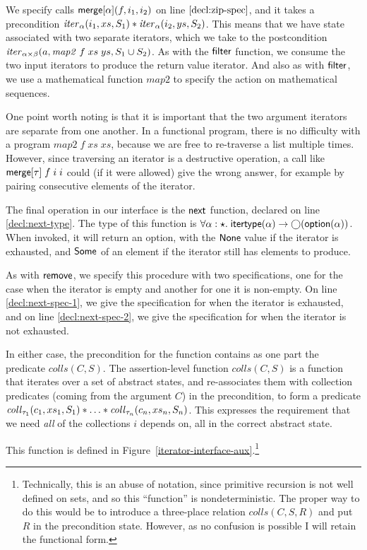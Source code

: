 We specify calls $\mathsf{merge}[\alpha](f, i_1, i_2)$ on line
$\ref{decl:zip-spec}$, and it takes a precondition
$\mathit{iter}_\alpha(i_1, xs, S_1) * \mathit{iter}_\alpha(i_2, ys, S_2)$.
This means that we have state associated with two separate iterators,
which we take to the postcondition $\mathit{iter}_{\alpha\times\beta}(a,
\mathit{map2}\;f\;xs\;ys, S_1 \cup S_2)$. As with the $\mathsf{filter}$ function, 
we consume the two input iterators to produce the return value iterator. 
And also as with $\mathsf{filter}$, we use a mathematical function $\mathit{map2}$
to specify the action on mathematical sequences. 

One point worth noting is that it is important that the two argument
iterators are separate from one another. In a functional program,
there is no difficulty with a program $\mathit{map2}\;f\;xs\;xs$, because
we are free to re-traverse a list multiple times. However, since
traversing an iterator is a destructive operation, a call like
$\mathsf{merge}[\tau]\;f\;i\;i$ could (if it were allowed) give the wrong answer,
for example by pairing consecutive elements of the iterator.

The final operation in our interface is the $\mathsf{next}$ function,
declared on line \ref{decl:next-type}. The type of this function
is $\forall \alpha:\star.\; \mathsf{itertype}(\alpha) \to
\bigcirc{(\mathsf{option }{(\alpha)})}$.  When invoked, it will return an
option, with the $\mathsf{None}$ value if the iterator is exhausted,
and $\mathsf{Some}$ of an element if the iterator still has elements to
produce.

As with $\mathsf{remove}$, we specify this procedure with two
specifications, one for the case when the iterator is empty and
another for one it is non-empty. On line \ref{decl:next-spec-1}, we
give the specification for when the iterator is exhausted, and
on line \ref{decl:next-spec-2}, we give the specification for when
the iterator is not exhausted.  

In either case, the precondition for the function contains as one part
the predicate $\mathit{colls}(C, S)$.  The assertion-level function
$\mathit{colls}(C,S)$ is a function that iterates over a set of
abstract states, and re-associates them with collection predicates
(coming from the argument $C$) in the precondition, to form a
predicate $\mathit{coll}_{\tau_1}(c_1, xs_1, S_1) * \ldots *
\mathit{coll}_{\tau_n}(c_n, xs_n, S_n)$.  This expresses the requirement
that we need \emph{all} of the collections $i$ depends on, all in the
correct abstract state.

This function is defined in Figure~\ref{iterator-interface-aux}.\footnote{Technically, 
this is an abuse of notation, since primitive recursion is not well defined on
sets, and so this ``function'' is nondeterministic.  The proper way
to do this would be to introduce a three-place relation
$\mathit{colls(C, S, R)}$ and put $R$ in the precondition
state. However, as no confusion is possible I will retain the
functional form.}


